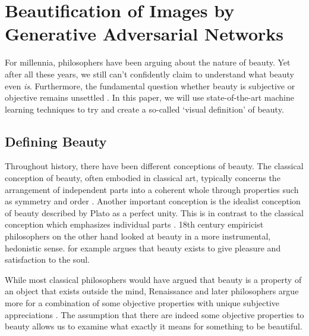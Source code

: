 \documentclass[../main.tex]{subfiles}
\begin{document}
\section{Beautification of Images by Generative Adversarial Networks}
For millennia, philosophers have been arguing about the nature of beauty. Yet after all these years, we still can't confidently claim to understand what beauty even \textit{is}. Furthermore, the fundamental question whether beauty is subjective or objective remains unsettled \parencite{sep-beauty}. In this paper, we will use state-of-the-art machine learning techniques to try and create a so-called `visual definition' of beauty.


\subsection{Defining Beauty}
Throughout history, there have been different conceptions of beauty. The classical conception of beauty, often embodied in classical art, typically concerns the arrangement of independent parts into a coherent whole through properties such as symmetry and order \parencite{wolfflin1932principles, sep-beauty}. Another important conception is the idealist conception of beauty described by Plato as a perfect unity. This is in contrast to the classical conception which emphasizes individual parts \parencite{sep-beauty}. 18th century empiricist philosophers on the other hand looked at beauty in a more instrumental, hedonistic sense. \textcite{hume2003treatise} for example argues that beauty exists to give pleasure and satisfaction to the soul.

While most classical philosophers would have argued that beauty is a property of an object that exists outside the mind, Renaissance and later philosophers argue more for a combination of some objective properties with unique subjective appreciations \parencite{sartwell2017entanglements}. The assumption that there are indeed some objective properties to beauty allows us to examine what exactly it means for something to be beautiful.




\end{document}

